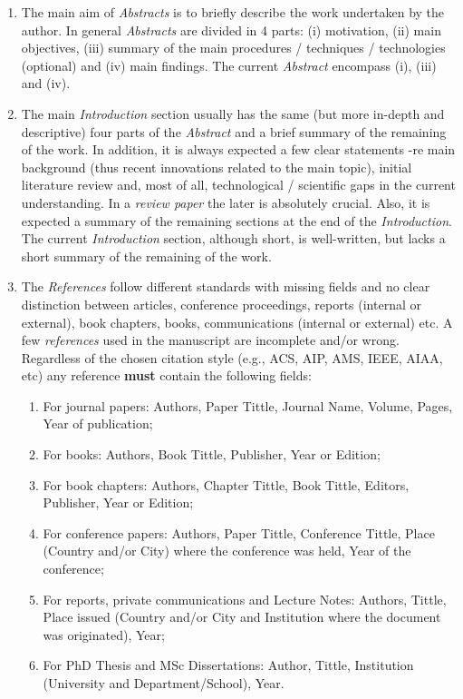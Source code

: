 \documentclass[14pt,twoside]{report}
\begin{document}
\begin{enumerate}
%
\item The main aim of {\it Abstracts} is to briefly describe the work undertaken by the author. In general {\it Abstracts} are divided in 4 parts: (i) motivation, (ii) main objectives, (iii) summary of the main procedures / techniques / technologies (optional) and (iv) main findings. The current {\it Abstract} encompass (i), (iii) and (iv).
%
\item The main {\it Introduction} section usually has the same (but more in-depth and descriptive) four parts of the {\it Abstract} and a brief summary of the remaining of the work. In addition, it is always expected a few clear statements -re main background (thus recent innovations related to the main topic), initial literature review and, most of all, technological / scientific gaps in the current understanding.  In a {\it review paper} the later is absolutely crucial. Also, it is expected a summary of the remaining sections at the end of the {\it Introduction}. The current {\it Introduction} section, although short, is well-written, but lacks a short summary of the remaining of the work.
%
\item The {\it References} follow different standards with missing fields and no clear distinction between articles, conference proceedings, reports (internal or external), book chapters, books, communications (internal or external) etc.  A few {\it references} used in the manuscript are incomplete and/or wrong. Regardless of the chosen citation style (e.g., ACS, AIP, AMS, IEEE, AIAA, etc) any reference {\bf must} contain the following fields: 
\begin{enumerate}
\item For journal papers: Authors, Paper Tittle, Journal Name, Volume, Pages, Year of publication;
\item For books: Authors, Book Tittle, Publisher, Year or Edition;
\item For book chapters: Authors, Chapter Tittle, Book Tittle, Editors, Publisher, Year or Edition;
\item For conference papers: Authors, Paper Tittle, Conference Tittle, Place (Country and/or City) where the conference was held, Year of the conference;
\item For reports,  private communications and Lecture Notes: Authors, Tittle, Place issued (Country and/or City and Institution where the document was originated), Year;
\item For PhD Thesis and MSc Dissertations: Author, Tittle, Institution (University and Department/School), Year.

\end{enumerate}
\end{enumerate}
\end{document}
